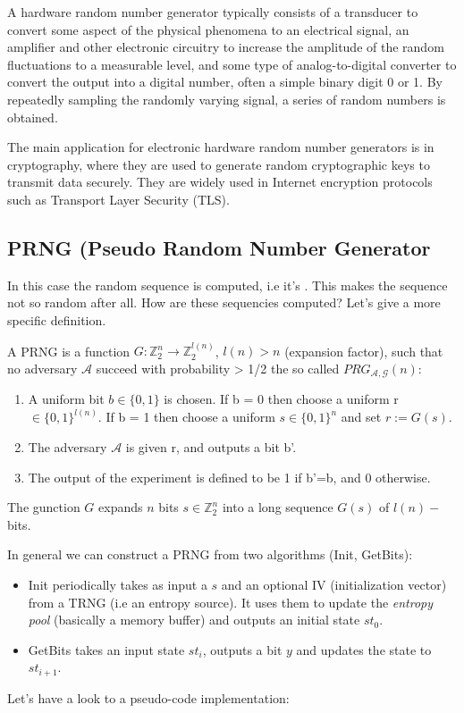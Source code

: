 \documentclass{article}
\begin{document}
A hardware random number generator typically consists of a transducer to convert some aspect of the physical phenomena to an electrical signal, an amplifier and other electronic circuitry to increase the amplitude of the random fluctuations to a measurable level, and some type of analog-to-digital converter to convert the output into a digital number, often a simple binary digit 0 or 1. By repeatedly sampling the randomly varying signal, a series of random numbers is obtained.

The main application for electronic hardware random number generators is in cryptography, where they are used to generate random cryptographic keys to transmit data securely. They are widely used in Internet encryption protocols such as Transport Layer Security (TLS). 
\subsection{PRNG (Pseudo Random Number Generator}
In this case the random sequence is computed, i.e it's . This makes the sequence not so random after all. How are these sequencies computed?
Let's give a more specific definition.

A PRNG is a function $G: \mathbb{Z}_2^n \to \mathbb{Z}_2^{l(n)}$, $l(n) > n$ (expansion factor), such that no adversary $\mathscr{A}$ succeed with probability > 1/2 the so called  $PRG_{\mathscr{A, G}}(n)$:
\begin{enumerate}[label=\alph*)]
    \item A uniform bit $b \in \{0,1\}$ is chosen. If b = 0 then choose a uniform r $\in \{0,1\}^{l(n)}$. If b = 1 then choose a uniform $s \in \{0,1\}^n$ and set $r := G(s)$.
    \item The adversary $\mathscr{A}$ is given r, and outputs a bit b'.
    \item The output of the experiment is defined to be 1 if b'=b, and 0 otherwise.
\end{enumerate}
The gunction $G$ expands $n$ bits $s \in \mathbb{Z}_2^n$ into a long sequence $G(s)$ of $l(n)-$bits.


In general we can construct a PRNG from two algorithms (Init, GetBits):
\begin{itemize}
    \item Init periodically takes as input a  $s$ and an optional IV (initialization vector) from a TRNG (i.e an entropy source). It uses them to update the \textit{entropy pool} (basically a memory buffer) and outputs an initial state $st_0$.
    \item GetBits takes an input state $st_i$, outputs a bit $y$ and updates the state to $st_{i+1}$.
\end{itemize}
Let's have a look to a pseudo-code implementation:
\end{document}
